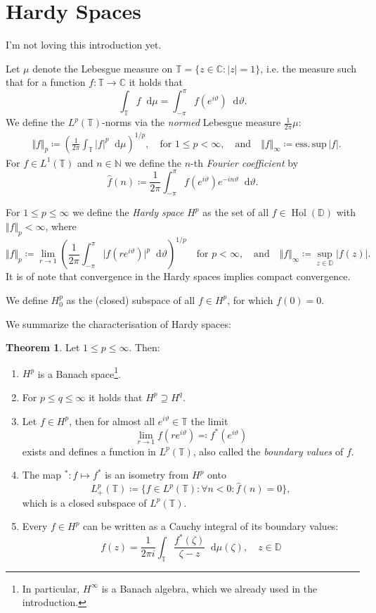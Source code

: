\documentclass[letterpaper, 11pt]{article}
\newcommand{\C}{\mathbb{C}}
\newcommand{\D}{\mathbb{D}}
\newcommand{\T}{\mathbb{T}}
\newcommand{\N}{\mathbb{N}}
\newcommand{\1}{\mathds{1}}
\newcommand{\diff}{\mathop{}\!\mathrm{d}}
\DeclareMathOperator*{\Hol}{Hol}
\newcommand{\todo}[1][Todo.]{{\color{red} #1}}
\theoremstyle{definition}
\newtheorem{theorem}{Theorem}
\begin{document}
\section{Hardy Spaces}

\todo[I'm not loving this introduction yet.]

Let $\mu$ denote the Lebesgue measure on $\T = \{ z \in \C : \vert z \vert = 1 \}$, i.e. the measure such that for a function $f : \T \to \C$ it holds that
$$ \int_\T f \diff \mu = \int_{-\pi}^\pi f(e^{i \vartheta}) \diff \vartheta. $$
We define the $L^p(\T)$-norms via the \emph{normed} Lebesgue measure $\frac{1}{2 \pi} \mu$:
\begin{align*}
  &\Vert f \Vert_p \coloneqq \left( \frac{1}{2\pi} \int_\T \vert f \vert^p \diff \mu \right)^{1/p}, \quad \textrm{for } 1 \leq p < \infty, \quad \textrm{and} \quad \Vert f \Vert_\infty \coloneqq \mathrm{ess.\,sup\,} \vert f \vert.
\end{align*}
For $f \in L^1(\T)$ and $n \in \N$ we define the $n$-th \emph{Fourier coefficient} by
$$ \hat{f}(n) \coloneqq \frac{1}{2\pi} \int_{-\pi}^{\pi} f(e^{i \vartheta}) e^{-i n \vartheta} \diff \vartheta. $$

For $1 \leq p \leq \infty$ we define the \emph{Hardy space} $H^p$ as the set of all $f \in \Hol(\D)$ with $\Vert f \Vert_p < \infty$, where
$$ \Vert f \Vert_p \coloneqq \lim_{r \to 1} \left( \frac{1}{2 \pi} \int_{-\pi}^{\pi} \vert f(r e^{i \vartheta}) \vert^p \diff \vartheta \right)^{1/p} \quad \textrm{for } p < \infty, \quad \textrm{and} \quad \Vert f \Vert_\infty \coloneqq \sup_{z \in \D} \vert f(z) \vert. $$
It is of note that convergence in the Hardy spaces implies compact convergence.

We define $H_0^p$ as the (closed) subspace of all $f \in H^p$, for which $f(0) = 0$.

We summarize the characterisation of Hardy spaces:
\begin{theorem} Let $1 \leq p \leq \infty$. Then:
  \begin{enumerate}
    \item $H^p$ is a Banach space\footnote{In particular, $H^\infty$ is a Banach algebra, which we already used in the introduction.}.
    \item For $p \leq q \leq \infty$ it holds that $H^p \supseteq H^q$.
    \item Let $f \in H^p$, then for almost all $e^{i \vartheta} \in \T$ the limit
    $$ \lim_{r \to 1} f(re^{i \vartheta}) \eqqcolon f^*(e^{i \vartheta}) $$
    exists and defines a function in $L^p(\T)$, also called the \emph{boundary values} of $f$.
    \item The map ${}^* : f \mapsto f^*$ is an isometry from $H^p$ onto
    $$ L^p_+(\T) \coloneqq \{ f \in L^p(\T) : \forall n < 0: \hat{f}(n) = 0 \}, $$
    which is a closed subspace of $L^p(\T)$.
    \item Every $f \in H^p$ can be written as a Cauchy integral of its boundary values:
    $$ f(z) = \frac{1}{2 \pi i} \int_\T \frac{f^*(\zeta)}{\zeta - z} \diff \mu(\zeta), \quad z \in \D $$
  \end{enumerate}
\end{theorem}
\end{document}
